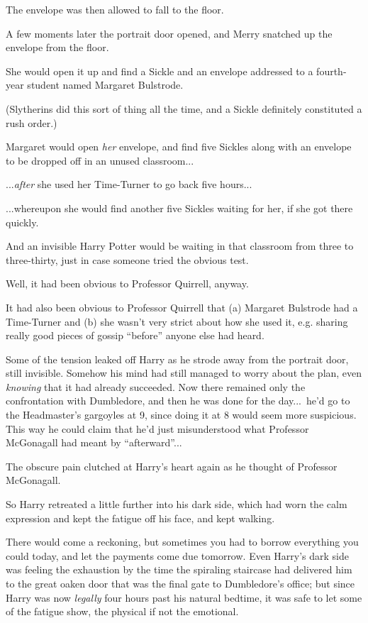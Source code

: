 The envelope was then allowed to fall to the floor.

A few moments later the portrait door opened, and Merry snatched up the envelope from the floor.

She would open it up and find a Sickle and an envelope addressed to a fourth-year student named Margaret Bulstrode.

(Slytherins did this sort of thing all the time, and a Sickle definitely constituted a rush order.)

Margaret would open \emph{her} envelope, and find five Sickles along with an envelope to be dropped off in an unused classroom...

...\emph{after} she used her Time-Turner to go back five hours...

...whereupon she would find another five Sickles waiting for her, if she got there quickly.

And an invisible Harry Potter would be waiting in that classroom from three  to three-thirty, just in case someone tried the obvious test.

Well, it had been obvious to Professor Quirrell, anyway.

It had also been obvious to Professor Quirrell that (a) Margaret Bulstrode had a Time-Turner and (b) she wasn’t very strict about how she used it, e.g. sharing really good pieces of gossip “before” anyone else had heard.

Some of the tension leaked off Harry as he strode away from the portrait door, still invisible. Somehow his mind had still managed to worry about the plan, even\emph{ knowing} that it had already succeeded. Now there remained only the confrontation with Dumbledore, and then he was done for the day...\ he’d go to the Headmaster’s gargoyles at 9, since doing it at 8 would seem more suspicious. This way he could claim that he’d just misunderstood what Professor McGonagall had meant by “afterward”...

The obscure pain clutched at Harry’s heart again as he thought of Professor McGonagall.

So Harry retreated a little further into his dark side, which had worn the calm expression and kept the fatigue off his face, and kept walking.

There would come a reckoning, but sometimes you had to borrow everything you could today, and let the payments come due tomorrow.
\sbreak
Even Harry’s dark side was feeling the exhaustion by the time the spiraling staircase had delivered him to the great oaken door that was the final gate to Dumbledore’s office; but since Harry was now \emph{legally} four hours past his natural bedtime, it was safe to let some of the fatigue show, the physical if not the emotional.

